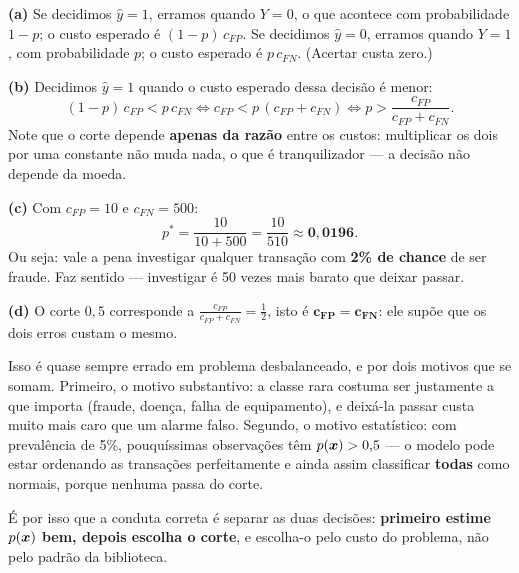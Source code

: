 \documentclass[11pt,a4paper]{article}
\begin{document}
\begin{solucao}
\textbf{(a)} Se decidimos $\widehat y=1$, erramos quando $Y=0$, o que acontece
com probabilidade $1-p$; o custo esperado é $(1-p)\,c_{FP}$. Se decidimos
$\widehat y=0$, erramos quando $Y=1$, com probabilidade $p$; o custo esperado é
$p\,c_{FN}$. (Acertar custa zero.)

\smallskip
\textbf{(b)} Decidimos $\widehat y=1$ quando o custo esperado dessa decisão é
menor:
\[
  (1-p)\,c_{FP} < p\,c_{FN}
  \iff c_{FP} < p\,(c_{FP}+c_{FN})
  \iff p > \frac{c_{FP}}{c_{FP}+c_{FN}} .
\]
Note que o corte depende \textbf{apenas da razão} entre os custos: multiplicar os
dois por uma constante não muda nada, o que é tranquilizador --- a decisão não
depende da moeda.

\smallskip
\textbf{(c)} Com $c_{FP}=10$ e $c_{FN}=500$:
\[
  p^\ast = \frac{10}{10+500} = \frac{10}{510} \approx \mathbf{0{,}0196}.
\]
Ou seja: vale a pena investigar qualquer transação com \textbf{2\% de chance} de
ser fraude. Faz sentido --- investigar é 50 vezes mais barato que deixar passar.

\smallskip
\textbf{(d)} O corte $0{,}5$ corresponde a
$\tfrac{c_{FP}}{c_{FP}+c_{FN}}=\tfrac12$, isto é $\mathbf{c_{FP}=c_{FN}}$: ele
supõe que os dois erros custam o mesmo.

Isso é quase sempre errado em problema desbalanceado, e por dois motivos que se
somam. Primeiro, o motivo substantivo: a classe rara costuma ser justamente a que
importa (fraude, doença, falha de equipamento), e deixá-la passar custa muito mais
caro que um alarme falso. Segundo, o motivo estatístico: com prevalência de 5\%,
pouquíssimas observações têm $p(\bm{x})>0{,}5$ --- o modelo pode estar ordenando as
transações perfeitamente e ainda assim classificar \textbf{todas} como normais, porque
nenhuma passa do corte.

É por isso que a conduta correta é separar as duas decisões: \textbf{primeiro estime
$p(\bm{x})$ bem, depois escolha o corte}, e escolha-o pelo custo do problema, não
pelo padrão da biblioteca.
\end{solucao}
\end{document}
